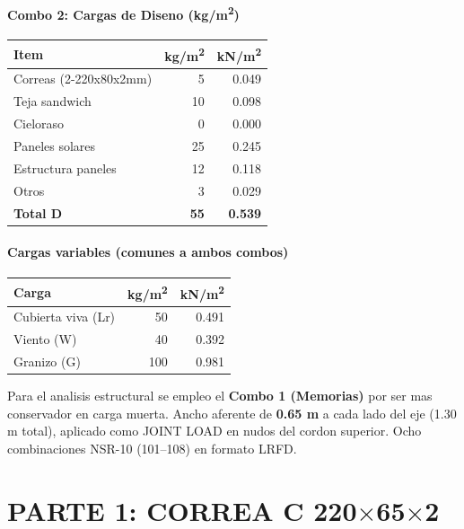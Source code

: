 \documentclass[12pt,a4paper]{article}
\newcommand{\tableheadrow}{\rowcolor{primary!15}\sffamily\footnotesize\bfseries\color{primary}}
\newcommand{\tabletotalrow}{\rowcolor{secondary!10}\sffamily\bfseries}
\begin{document}
\subsection{Combo 2: Cargas de Diseno (kg/m\textsuperscript{2})}
\begin{center}
\begin{tabular}{l r r}
\toprule
\tableheadrow
\textbf{Item} & \textbf{kg/m\textsuperscript{2}} & \textbf{kN/m\textsuperscript{2}} \\
\midrule
Correas (2-220x80x2mm) & 5 & 0.049 \\
Teja sandwich & 10 & 0.098 \\
Cieloraso & 0 & 0.000 \\
Paneles solares & 25 & 0.245 \\
Estructura paneles & 12 & 0.118 \\
Otros & 3 & 0.029 \\
\midrule
\tabletotalrow
\textbf{Total D} & \textbf{55} & \textbf{0.539} \\
\bottomrule
\end{tabular}
\end{center}

\subsection{Cargas variables (comunes a ambos combos)}
\begin{center}
\begin{tabular}{l r r}
\toprule
\tableheadrow
\textbf{Carga} & \textbf{kg/m\textsuperscript{2}} & \textbf{kN/m\textsuperscript{2}} \\
\midrule
Cubierta viva (Lr) & 50 & 0.491 \\
Viento (W) & 40 & 0.392 \\
Granizo (G) & 100 & 0.981 \\
\bottomrule
\end{tabular}
\end{center}

Para el analisis estructural se empleo el \textbf{Combo 1 (Memorias)} por ser
mas conservador en carga muerta. Ancho aferente de \textbf{0.65 m} a cada lado
del eje (1.30 m total), aplicado como JOINT LOAD en nudos del cordon superior.
Ocho combinaciones NSR-10 (101--108) en formato LRFD.

\newpage
\part*{PARTE 1: CORREA C 220$\times$65$\times$2}
\end{document}
